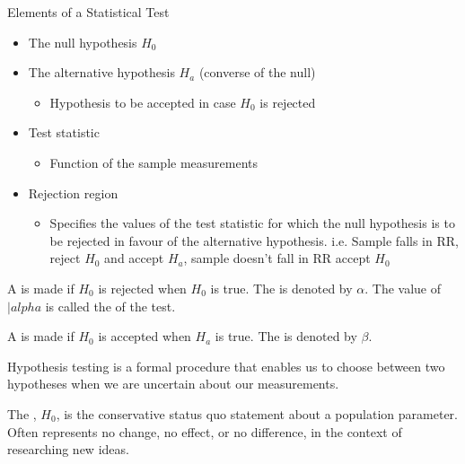 \documentclass[12pt, a4paper, twoside, openright, titlepage]{book}
\begin{document}
\begin{cust}{Elements of a Statistical Test}{}
    \leavevmode
    \begin{itemize}
        \item The null hypothesis $H_0$
        \item The alternative hypothesis $H_a$ (converse of the null) \begin{itemize}
                \item Hypothesis to be accepted in case $H_0$ is rejected
        \end{itemize}
        \item Test statistic \begin{itemize}
                \item Function of the sample measurements
        \end{itemize}
        \item Rejection region \begin{itemize}
                \item Specifies the values of the test statistic for which the null hypothesis is to be rejected in favour of the alternative hypothesis. i.e. Sample falls in RR, reject $H_0$ and accept $H_a$, sample doesn't fall in RR accept $H_0$
        \end{itemize}
    \end{itemize}
\end{cust}


\begin{defn}{}{}
    A  is made if $H_0$ is rejected when $H_0$ is true. The  is denoted by $\alpha$. The value of $|alpha$ is called the  of the test. 


    A  is made if $H_0$ is accepted when $H_a$ is true. The  is denoted by $\beta$.
\end{defn}


\begin{rmk}{}{}
    Hypothesis testing is a formal procedure that enables us to choose between two hypotheses when we are uncertain about our measurements.
\end{rmk}

\begin{defn}{}{}
    The , $H_0$, is the conservative status quo statement about a population parameter. Often represents no change, no effect, or no difference, in the context of researching new ideas.
\end{defn}
\end{document}
